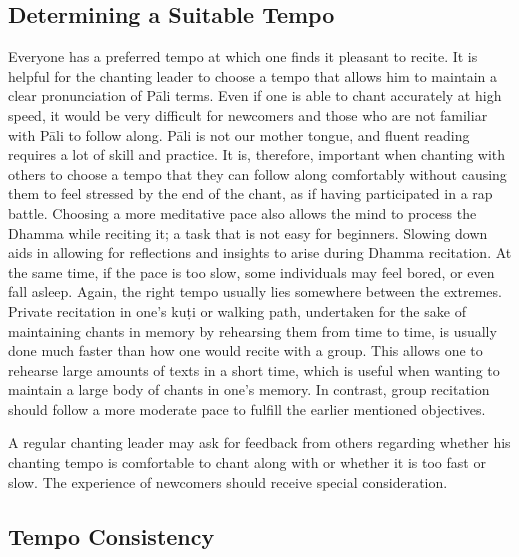 \subsection*{Determining a Suitable Tempo}

Everyone has a preferred tempo at which one finds it pleasant to recite. It is helpful for the chanting leader to choose a tempo that allows him to maintain a clear pronunciation of Pāli terms. Even if one is able to chant accurately at high speed, it would be very difficult for newcomers and those who are not familiar with Pāli to follow along. Pāli is not our mother tongue, and fluent reading requires a lot of skill and practice. It is, therefore, important when chanting with others to choose a tempo that they can follow along comfortably without causing them to feel stressed by the end of the chant, as if having participated in a rap battle. Choosing a more meditative pace also allows the mind to process the Dhamma while reciting it; a task that is not easy for beginners. Slowing down aids in allowing for reflections and insights to arise during Dhamma recitation. At the same time, if the pace is too slow, some individuals may feel bored, or even fall asleep. Again, the right tempo usually lies somewhere between the extremes. Private recitation in one's kuṭi or walking path, undertaken for the sake of maintaining chants in memory by rehearsing them from time to time, is usually done much faster than how one would recite with a group. This allows one to rehearse large amounts of texts in a short time, which is useful when wanting to maintain a large body of chants in one's memory. In contrast, group recitation should follow a more moderate pace to fulfill the earlier mentioned objectives.

A regular chanting leader may ask for feedback from others regarding whether his chanting tempo is comfortable to chant along with or whether it is too fast or slow. The experience of newcomers should receive special consideration.

\ifbfiveversion\vspace{-0.14cm}\fi

\subsection*{Tempo Consistency}

